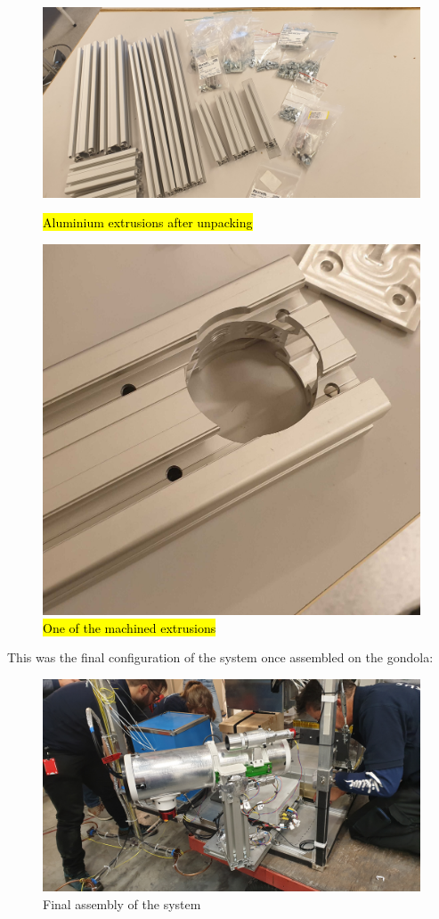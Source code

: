 \begin{figure}[H]
	\centering
	\begin{minipage}[t]{0.4\linewidth}
		\centering
		\includegraphics[width=1\linewidth]{4-experiment-design/img/mechanical/extr.jpg}
		\caption{\hl{Aluminium extrusions after unpacking}}
		\label{fig::mechanical::extrusions}
	\end{minipage}
	\hspace{0.05\linewidth}
	\begin{minipage}[t]{0.4\linewidth}
		\centering
		\includegraphics[width=0.65\linewidth]{4-experiment-design/img/mechanical/ext-mach.jpg}
		\caption{\hl{One of the machined extrusions}}
		\label{fig::mechanical::mach-extr}
	\end{minipage}
\end{figure}

\newpage
This was the final configuration of the system once assembled on the gondola:

\begin{figure}[H]
	\centering
	\includegraphics[width=\textwidth]{4-experiment-design/img/mechanical/assembled.jpg}
	\caption{Final assembly of the system}
	\label{fig::mechanical::assy}
\end{figure}
